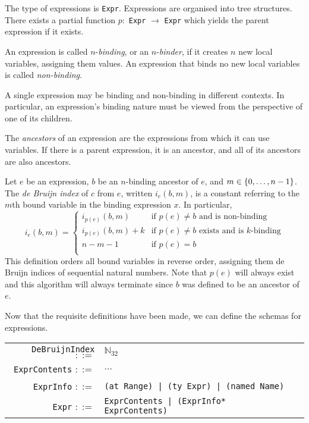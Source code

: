 \documentclass[11pt]{book}
\begin{document}
The type of expressions is \lstinline{Expr}.
Expressions are organised into tree structures.
There exists a partial function \( p : \) \lstinline{Expr} \( \to \) \lstinline{Expr} which yields the parent expression if it exists.

\begin{defn}
    An expression is called \( n \)-\textit{binding}, or an \( n \)-\textit{binder}, if it creates \( n \) new local variables, assigning them values.
    An expression that binds no new local variables is called \textit{non-binding}.

    A single expression may be binding and non-binding in different contexts.
    In particular, an expression's binding nature must be viewed from the perspective of one of its children.
\end{defn}

\begin{defn}
    The \textit{ancestors} of an expression are the expressions from which it can use variables.
    If there is a parent expression, it is an ancestor, and all of its ancestors are also ancestors.
\end{defn}

\begin{defn}
    Let \( e \) be an expression, \( b \) be an \( n \)-binding ancestor of \( e \), and \( m \in \qty{0, \dots, n-1} \).
    The \textit{de Bruijn index} of \( c \) from \( e \), written \( i_e(b, m) \), is a constant referring to the \( m \)th bound variable in the binding expression \( x \).
    In particular,
    \[ i_e(b, m) = \begin{cases}
        i_{p(e)}(b, m) & \text{if } p(e) \neq b \text{ and is non-binding} \\
        i_{p(e)}(b, m) + k & \text{if } p(e) \neq b \text{ exists and is } k \text{-binding} \\
        n - m - 1 & \text{if } p(e) = b \\
    \end{cases} \]
    This definition orders all bound variables in reverse order, assigning them de Bruijn indices of sequential natural numbers.
    Note that \( p(e) \) will always exist and this algorithm will always terminate since \( b \) was defined to be an ancestor of \( e \).
\end{defn}

Now that the requisite definitions have been made, we can define the schemas for expressions.

\begin{tabular}{r l p{7cm}}
    \lstinline!DeBruijnIndex! \( ::= \) & \( \mathbb N_{32} \) \\
    \lstinline!ExprContents! \( ::= \) & \( \dots \) \\
    \lstinline!ExprInfo! \( ::= \) & \lstinline!(at Range) | (ty Expr) | (named Name)! \\
    \lstinline!Expr! \( ::= \) & \lstinline!ExprContents | (ExprInfo* ExprContents)!
\end{tabular}
\end{document}
